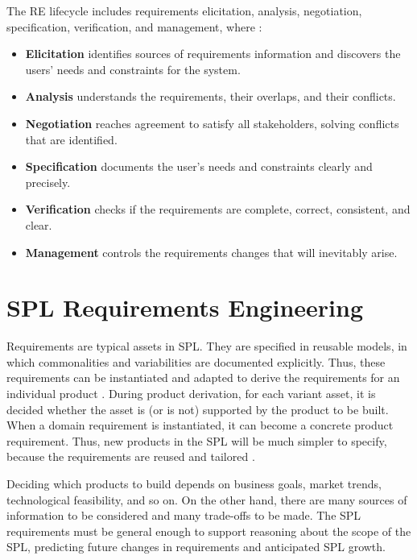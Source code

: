 The \ac{RE} lifecycle includes requirements elicitation, analysis, negotiation, specification, verification, and 
management, where \citep{clements2002software,sommerville2005integrated}:

\begin{itemize}
\item \textbf{Elicitation} identifies sources of requirements information and discovers the 
users’ needs and constraints for the system.
\item \textbf{Analysis} understands the requirements, their overlaps, and their conflicts.
\item \textbf{Negotiation} reaches agreement to satisfy all stakeholders,
solving conflicts that are identified.
\item \textbf{Specification} documents the user’s needs and constraints clearly and precisely.
\item \textbf{Verification} checks if the requirements are complete, correct, consistent, and clear.
\item \textbf{Management} controls the requirements changes that will inevitably arise.
\end{itemize}

\section{SPL Requirements Engineering}
\label{sc:splrequirementsengineering}

Requirements are typical assets in \ac{SPL}. They are specified in reusable
models, in which commonalities and variabilities are documented explicitly. Thus, these requirements 
can be instantiated and adapted to derive the requirements for an individual
product \citep{cheng2007research}.
During product derivation, for each variant asset, it is decided whether the asset is (or is not) supported by 
the product to be built. When a domain requirement is instantiated, it can become a concrete product requirement. 
Thus, new products in the \ac{SPL} will be much simpler to specify, because the
requirements are reused and tailored \citep{clements2002software}. 

Deciding which products to build depends on business goals, market trends,
technological feasibility, and so on. On the other hand, there are many sources of information 
to be considered and many trade-offs to be made. The \ac{SPL} requirements must be general enough to support 
reasoning about the scope of the \ac{SPL}, predicting future changes in
requirements and anticipated \ac{SPL} growth.

